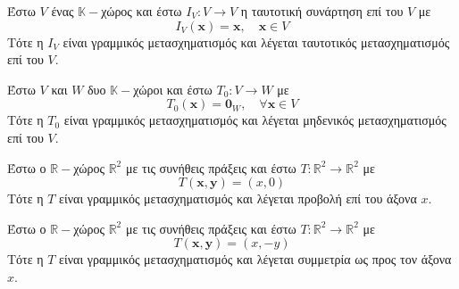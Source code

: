 
\begin{example}[Ταυτοτικός]
  Έστω $V$ ένας $ \mathbb{K} - $χώρος και έστω $ I_{V} \colon V \to V $ η ταυτοτική 
  συνάρτηση επί του $V$ με 
  \[
    I_{V}(\mathbf{x}) = \mathbf{x}, \quad \mathbf{x} \in V   
  \]
  Τότε η $I_{V}$ είναι γραμμικός μετασχηματισμός και λέγεται 
  \textcolor{Col1}{ταυτοτικός} μετασχηματισμός επί του $V$. 
\end{example}

\begin{example}[Μηδενικός]
  Έστω $V$ και $W$ δυο $ \mathbb{K}- $χώροι και έστω $ T_{0} \colon V \to W $ με 
  \[
    T_{0}(\mathbf{x}) = \mathbf{0}_{W}, \quad \forall \mathbf{x} \in V
  \]
  Τότε η $T_{0}$ είναι γραμμικός μετασχηματισμός και λέγεται 
  \textcolor{Col1}{μηδενικός} μετασχηματισμός επί του $V$.
\end{example}

\begin{example}
  Έστω ο $ \mathbb{R}- $χώρος $ \mathbb{R}^{2} $ με τις συνήθεις πράξεις και έστω 
  $ T \colon \mathbb{R}^{2} \to \mathbb{R}^{2} $ με 
  \[
    T(\mathbf{x}, \mathbf{y}) = (x, 0) 
  \] 
  Τότε η $T$ είναι γραμμικός μετασχηματισμός και λέγεται \textcolor{Col1}{προβολή} επί 
  του άξονα $x$.
\end{example}

\begin{example}
  Έστω ο $ \mathbb{R}- $χώρος $ \mathbb{R}^{2} $ με τις συνήθεις πράξεις και έστω 
  $ T \colon \mathbb{R}^{2} \to \mathbb{R}^{2} $ με 
  \[
    T(\mathbf{x}, \mathbf{y}) = (x, -y) 
  \] 
  Τότε η $T$ είναι γραμμικός μετασχηματισμός και λέγεται \textcolor{Col1}{συμμετρία} ως 
  προς τον άξονα $x$.
\end{example}

